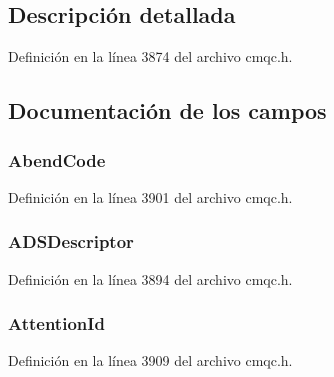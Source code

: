 \subsection{Descripción detallada}


Definición en la línea 3874 del archivo cmqc.\+h.



\subsection{Documentación de los campos}
\hypertarget{structtag_m_q_c_i_h_a5148328a3de9924b38c87bd067cf53ff}{}
\subsubsection[{Abend\+Code}]{ Abend\+Code}\label{structtag_m_q_c_i_h_a5148328a3de9924b38c87bd067cf53ff}


Definición en la línea 3901 del archivo cmqc.\+h.

\hypertarget{structtag_m_q_c_i_h_ac22565f1798202563c8f02aca8f2995b}{}
\subsubsection[{A\+D\+S\+Descriptor}]{ A\+D\+S\+Descriptor}\label{structtag_m_q_c_i_h_ac22565f1798202563c8f02aca8f2995b}


Definición en la línea 3894 del archivo cmqc.\+h.

\hypertarget{structtag_m_q_c_i_h_a3392a4463ba2f1390958365c4589cb4e}{}
\subsubsection[{Attention\+Id}]{ Attention\+Id}\label{structtag_m_q_c_i_h_a3392a4463ba2f1390958365c4589cb4e}


Definición en la línea 3909 del archivo cmqc.\+h.

